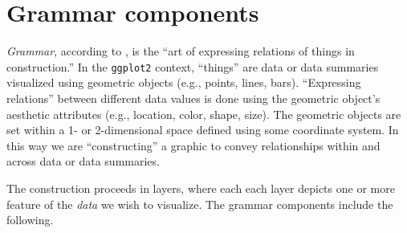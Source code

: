 \documentclass[
  11pt,
]{krantz}
\theoremstyle{definition}
\theoremstyle{definition}
\theoremstyle{definition}
\theoremstyle{definition}
\theoremstyle{remark}
\begin{document}
\hypertarget{ggplotComponents}{%
\section{Grammar components}\label{ggplotComponents}}

\emph{Grammar}, according to \citet{johnson1969grammatical}, is the ``art of expressing relations of things in construction.'' In the \texttt{ggplot2} context, ``things'' are data or data summaries visualized using geometric objects (e.g., points, lines, bars). ``Expressing relations'' between different data values is done using the geometric object's aesthetic attributes (e.g., location, color, shape, size). The geometric objects are set within a 1- or 2-dimensional space defined using some coordinate system. In this way we are ``constructing'' a graphic to convey relationships within and across data or data summaries.

The construction proceeds in layers, where each each layer depicts one or more feature of the \emph{data} we wish to visualize. The grammar components include the following.
\end{document}
